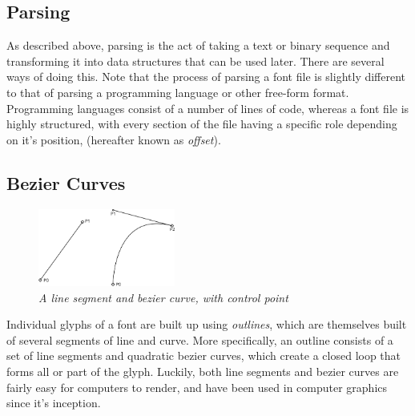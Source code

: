 \documentclass{report}
\begin{document}
\subsection{Parsing}
As described above, parsing is the act of taking a text or binary sequence and
transforming it into data structures that can be used later. There are several
ways of doing this. Note that the process of parsing a font file is slightly
different to that of parsing a programming language or other free-form format.
Programming languages consist of a number of lines of code, whereas a font file
is highly structured, with every section of the file having a specific role
depending on it's position, (hereafter known as \textit{offset}).

\subsection{Bezier Curves}
\begin{figure}
  \centering
  \includegraphics[width=0.4\textwidth]{bezier2img}
  \caption{\textit{A line segment and bezier curve, with control point}}
\end{figure}
Individual glyphs of a font are built up using \textit{outlines}, which are
themselves built of several segments of line and curve. More specifically, an
outline consists of a set of line segments and quadratic bezier curves, which
create a closed loop that forms all or part of the glyph. Luckily, both line
segments and bezier curves are fairly easy for computers to render, and have
been used in computer graphics since it's inception.
\end{document}
